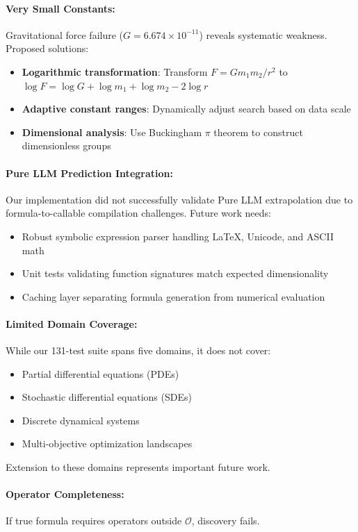 \paragraph{Very Small Constants:} Gravitational force failure ($G = 6.674 \times 10^{-11}$) reveals systematic weakness. Proposed solutions:
\begin{itemize}
\item \textbf{Logarithmic transformation}: Transform $F = Gm_1m_2/r^2$ to $\log F = \log G + \log m_1 + \log m_2 - 2\log r$
\item \textbf{Adaptive constant ranges}: Dynamically adjust search based on data scale
\item \textbf{Dimensional analysis}: Use Buckingham $\pi$ theorem to construct dimensionless groups
\end{itemize}

\paragraph{Pure LLM Prediction Integration:} Our implementation did not successfully validate Pure LLM extrapolation due to formula-to-callable compilation challenges. Future work needs:
\begin{itemize}
\item Robust symbolic expression parser handling LaTeX, Unicode, and ASCII math
\item Unit tests validating function signatures match expected dimensionality
\item Caching layer separating formula generation from numerical evaluation
\end{itemize}

\paragraph{Limited Domain Coverage:} While our 131-test suite spans five domains, it does not cover:
\begin{itemize}
\item Partial differential equations (PDEs)
\item Stochastic differential equations (SDEs)
\item Discrete dynamical systems
\item Multi-objective optimization landscapes
\end{itemize}

Extension to these domains represents important future work.

\paragraph{Operator Completeness:} If true formula requires operators outside $\mathcal{O}$, discovery fails.

